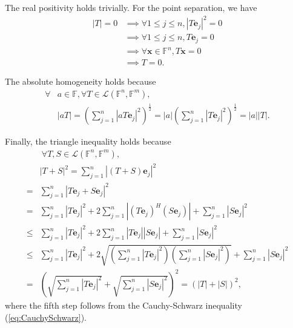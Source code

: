 \begin{solution}
  The real positivity holds trivially.
  For the point separation, we have
  \begin{align*}
    |T| = 0 &\implies \forall 1 \leq j \leq n,|T\mathbf{e}_j|^2 = 0\\
            &\implies \forall 1 \leq j \leq n, T\mathbf{e}_j = 0\\
            &\implies \forall \mathbf{x} \in \mathbb{F}^n, T\mathbf{x} = 0\\
    &\implies T = 0.
  \end{align*}

  The absolute homogeneity holds because
  \begin{align*}
    \forall &a \in \mathbb{F}, \forall T \in \mathcal{L}(\mathbb{F}^n,
      \mathbb{F}^m),\\
            &|aT| = \left(\sum\limits_{j =1}^n|aT\mathbf{e}_j|^2\right)
              ^{\frac{1}{2}} 
    = |a|\left(\sum\limits_{j =
    1}^n|T\mathbf{e}_j|^2\right)^{\frac{1}{2}} = |a||T|.
  \end{align*}
  
  Finally, the triangle inequality holds because
  \begin{align*}
    &\ \forall T, S \in \mathcal{L}(\mathbb{F}^n, \mathbb{F}^m),\\
      &|T + S|^2 = \sum\limits_{j = 1}^n|(T+S)\mathbf{e}_j|^2
      \\ =& \sum\limits_{j = 1}^n|T\mathbf{e}_j + S\mathbf{e}_j|^2
      \\
      =& \sum\limits_{j = 1}^n|T\mathbf{e}_j|^2
         + 2\sum\limits_{j = 1}^n|(T\mathbf{e}_j)^H(S\mathbf{e}_j)|
         + \sum\limits_{j = 1}^n|S\mathbf{e}_j|^2
      \\
      \le& \sum\limits_{j = 1}^n|T\mathbf{e}_j|^2
           + 2\sum\limits_{j = 1}^n|T\mathbf{e}_j||S\mathbf{e}_j|
           + \sum\limits_{j = 1}^n|S\mathbf{e}_j|^2
      \\
      \le& \sum\limits_{j = 1}^n|T\mathbf{e}_j|^2 %
           + 2\sqrt{\left(\sum\limits_{j = 1}^n|T\mathbf{e}_j|^2\right)
           \left(\sum\limits_{j = 1}^n|S\mathbf{e}_j|^2\right)}
           + \sum\limits_{j = 1}^n|S\mathbf{e}_j|^2
      \\
      =& \left(\sqrt{\sum\limits_{j = 1}^n|T\mathbf{e}_j|^2} +
         \sqrt{\sum\limits_{j = 1}^n|S\mathbf{e}_j|^2}\right)^2 = (|T|
         + |S|)^2, 
    \end{align*}
    where the fifth step follows from the Cauchy-Schwarz inequality
    (\ref{eq:CauchySchwarz}).  
\end{solution}

